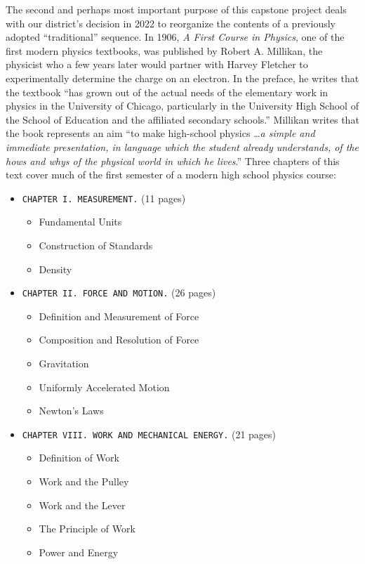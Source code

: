 \documentclass[12pt]{article}
\begin{document}
The second and perhaps most important purpose of this capstone project deals with our district's decision in 2022 to reorganize the contents of a previously adopted ``traditional'' sequence. In 1906, \textit{A First Course in Physics}, one of the first modern physics textbooks, was published by Robert A. Millikan, the physicist who a few years later would partner with Harvey Fletcher to experimentally determine the charge on an electron. In the preface, he writes that the textbook ``has grown out of the actual needs of the elementary work in physics in the University of Chicago, particularly in the University High School of the School of Education and the affiliated secondary schools.'' Millikan writes that the book represents an aim ``to make high-school physics \ldots \textit{a simple and immediate presentation, in language which the student already understands, of the hows and whys of the physical world in which he lives}.'' Three chapters of this text cover much of the first semester of a modern high school physics course:

\bgroup
\small
\begin{itemize}[topsep=-2pt,itemsep=-2pt]
    \item \texttt{CHAPTER I. MEASUREMENT.} (11 pages)
    \begin{itemize}[topsep=-2pt,itemsep=-2pt]
        \item[] Fundamental Units
        \item[] Construction of Standards
        \item[] Density
    \end{itemize}
    
    \item \texttt{CHAPTER II. FORCE AND MOTION.} (26 pages)
    \begin{itemize}[topsep=-2pt,itemsep=-2pt]
        \item[] Definition and Measurement of Force
        \item[] Composition and Resolution of Force
        \item[] Gravitation
        \item[] Uniformly Accelerated Motion
        \item[] Newton's Laws
    \end{itemize}

    \item \texttt{CHAPTER VIII. WORK AND MECHANICAL ENERGY.} (21 pages)
    \begin{itemize}[topsep=-2pt,itemsep=-2pt]
        \item[] Definition of Work
        \item[] Work and the Pulley
        \item[] Work and the Lever
        \item[] The Principle of Work
        \item[] Power and Energy
    \end{itemize}
\end{itemize}
\egroup
\end{document}
